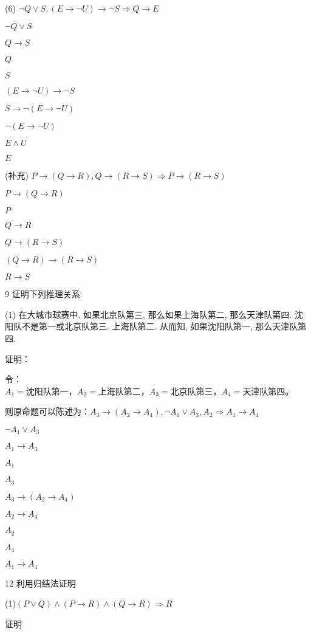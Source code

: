 \documentclass[
]{article}
\begin{document}
(6)
\(\neg Q\vee S, ( E\rightarrow \neg U)\rightarrow \neg S\Rightarrow Q\rightarrow E\)

\(\neg Q\vee S\)

\(Q\rightarrow S\)

\(Q\)

\(S\)

\(( E\rightarrow \neg U)\rightarrow \neg S\)

\(S\rightarrow \neg (E\rightarrow \neg U)\)

\(\neg (E\rightarrow \neg U)\)

\(E\wedge U\)

\(E\)

(补充)
\(P\rightarrow (Q\rightarrow R),Q\rightarrow (R\rightarrow S)\Rightarrow P\rightarrow (R\rightarrow S)\)

\(P\rightarrow (Q\rightarrow R)\)

\(P\)

\(Q\rightarrow R\)

\(Q\rightarrow (R\rightarrow S)\)

\((Q\rightarrow R)\rightarrow (R\rightarrow S)\)

\(R\rightarrow S\)

9 证明下列推理关系:

(1) 在大城市球赛中. 如果北京队第三, 那么如果上海队第二, 那么天津队第四.
沈阳队不是第一或北京队第三. 上海队第二. 从而知, 如果沈阳队第一,
那么天津队第四.

证明：

令：\\
\(A_1=\)沈阳队第一，\(A_2=\)上海队第二，\(A_3=\)北京队第三，\(A_4=\)天津队第四。

则原命题可以陈述为：\(A_3\rightarrow (A_2\rightarrow A_4),\neg A_1\vee A_3,A_2\Rightarrow A_1\rightarrow A_4\)

\(\neg A_1\vee A_3\)

\(A_1\rightarrow A_3\)

\(A_1\)

\(A_3\)

\(A_3\rightarrow (A_2\rightarrow A_4)\)

\(A_2\rightarrow A_4\)

\(A_2\)

\(A_4\)

\(A_1\rightarrow A_4\)

12 利用归结法证明

(1)\(( P \vee Q) \wedge ( P \rightarrow R) \wedge (Q\rightarrow R)\Rightarrow R\)

证明
\end{document}
